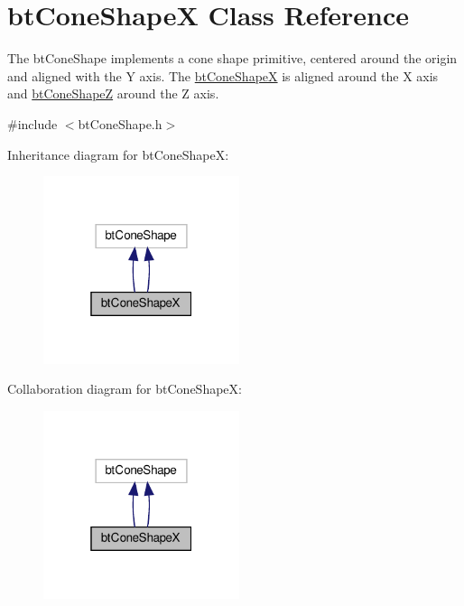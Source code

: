 \hypertarget{classbtConeShapeX}{}\section{bt\+Cone\+ShapeX Class Reference}
\label{classbtConeShapeX}


The bt\+Cone\+Shape implements a cone shape primitive, centered around the origin and aligned with the Y axis. The \hyperlink{classbtConeShapeX}{bt\+Cone\+ShapeX} is aligned around the X axis and \hyperlink{classbtConeShapeZ}{bt\+Cone\+ShapeZ} around the Z axis.  




{\ttfamily \#include $<$bt\+Cone\+Shape.\+h$>$}



Inheritance diagram for bt\+Cone\+ShapeX\+:
\nopagebreak
\begin{figure}[H]
\begin{center}
\leavevmode
\includegraphics[width=163pt]{classbtConeShapeX__inherit__graph}
\end{center}
\end{figure}


Collaboration diagram for bt\+Cone\+ShapeX\+:
\nopagebreak
\begin{figure}[H]
\begin{center}
\leavevmode
\includegraphics[width=163pt]{classbtConeShapeX__coll__graph}
\end{center}
\end{figure}
